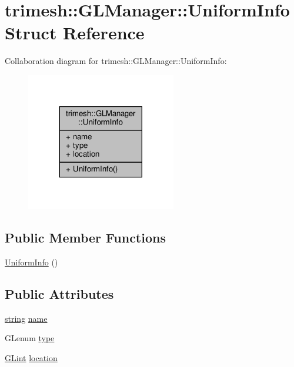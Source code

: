 \hypertarget{structtrimesh_1_1GLManager_1_1UniformInfo}{}\section{trimesh\+:\+:G\+L\+Manager\+:\+:Uniform\+Info Struct Reference}
\label{structtrimesh_1_1GLManager_1_1UniformInfo}


Collaboration diagram for trimesh\+:\+:G\+L\+Manager\+:\+:Uniform\+Info\+:\nopagebreak
\begin{figure}[H]
\begin{center}
\leavevmode
\includegraphics[width=185pt]{d5/dea/structtrimesh_1_1GLManager_1_1UniformInfo__coll__graph}
\end{center}
\end{figure}
\subsection*{Public Member Functions}
\begin{DoxyCompactItemize}
\item 
\hyperlink{structtrimesh_1_1GLManager_1_1UniformInfo_a43c3b4eab8534c3989c9c7a18b59a1c7}{Uniform\+Info} ()
\end{DoxyCompactItemize}
\subsection*{Public Attributes}
\begin{DoxyCompactItemize}
\item 
\hyperlink{namespacetrimesh_a51b4a31323874089623d4b17afabc1aa}{string} \hyperlink{structtrimesh_1_1GLManager_1_1UniformInfo_ace083b29a0ba5a1ecaebe0dac4a046c6}{name}
\item 
G\+Lenum \hyperlink{structtrimesh_1_1GLManager_1_1UniformInfo_a9886509cdeb491200b6c44755677406f}{type}
\item 
\hyperlink{namespacetrimesh_aeccc290e30b317c861fb146956528187}{G\+Lint} \hyperlink{structtrimesh_1_1GLManager_1_1UniformInfo_a435063c93b7f6e4887d63ab81b9ad44a}{location}
\end{DoxyCompactItemize}


